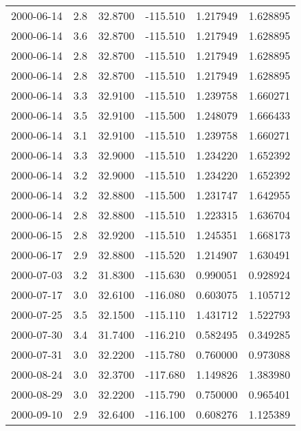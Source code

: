 \begin{tabular}{lrrrrr}
2000-06-14 &       2.8 &  32.8700 &  -115.510 &         1.217949 &         1.628895 \\
2000-06-14 &       3.6 &  32.8700 &  -115.510 &         1.217949 &         1.628895 \\
2000-06-14 &       2.8 &  32.8700 &  -115.510 &         1.217949 &         1.628895 \\
2000-06-14 &       2.8 &  32.8700 &  -115.510 &         1.217949 &         1.628895 \\
2000-06-14 &       3.3 &  32.9100 &  -115.510 &         1.239758 &         1.660271 \\
2000-06-14 &       3.5 &  32.9100 &  -115.500 &         1.248079 &         1.666433 \\
2000-06-14 &       3.1 &  32.9100 &  -115.510 &         1.239758 &         1.660271 \\
2000-06-14 &       3.3 &  32.9000 &  -115.510 &         1.234220 &         1.652392 \\
2000-06-14 &       3.2 &  32.9000 &  -115.510 &         1.234220 &         1.652392 \\
2000-06-14 &       3.2 &  32.8800 &  -115.500 &         1.231747 &         1.642955 \\
2000-06-14 &       2.8 &  32.8800 &  -115.510 &         1.223315 &         1.636704 \\
2000-06-15 &       2.8 &  32.9200 &  -115.510 &         1.245351 &         1.668173 \\
2000-06-17 &       2.9 &  32.8800 &  -115.520 &         1.214907 &         1.630491 \\
2000-07-03 &       3.2 &  31.8300 &  -115.630 &         0.990051 &         0.928924 \\
2000-07-17 &       3.0 &  32.6100 &  -116.080 &         0.603075 &         1.105712 \\
2000-07-25 &       3.5 &  32.1500 &  -115.110 &         1.431712 &         1.522793 \\
2000-07-30 &       3.4 &  31.7400 &  -116.210 &         0.582495 &         0.349285 \\
2000-07-31 &       3.0 &  32.2200 &  -115.780 &         0.760000 &         0.973088 \\
2000-08-24 &       3.0 &  32.3700 &  -117.680 &         1.149826 &         1.383980 \\
2000-08-29 &       3.0 &  32.2200 &  -115.790 &         0.750000 &         0.965401 \\
2000-09-10 &       2.9 &  32.6400 &  -116.100 &         0.608276 &         1.125389 \\

\end{tabular}
